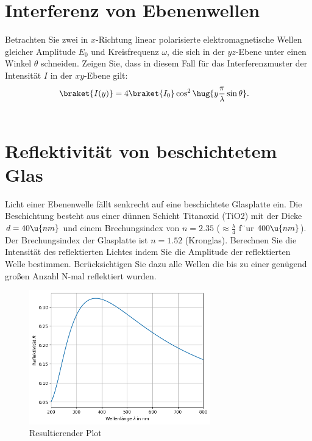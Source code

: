 \documentclass[ex,minted]{exercise}
\begin{document}
\section{Interferenz von Ebenenwellen}
Betrachten Sie zwei in $x$-Richtung linear polarisierte elektromagnetische Wellen gleicher Amplitude $E_0$ und Kreisfrequenz 
\(\omega\), die sich in der $yz$-Ebene unter einen Winkel \(\theta\) schneiden. Zeigen Sie, dass in diesem Fall für das
Interferenzmuster der Intensität \(I\) in der \(xy\)-Ebene gilt:
\begin{align*}
    \braket{I(y)}&= 4\braket{I_0}\cos^2\hug{y\frac\pi\lambda \sin\theta}.
\end{align*}

\dottedlineet 

\begin{align*}
\end{align*}


\section{Reflektivität von beschichtetem Glas}
Licht einer Ebenenwelle fällt senkrecht auf eine beschichtete Glasplatte ein. 
Die Beschichtung besteht aus einer dünnen Schicht Titanoxid (TiO2) mit der 
Dicke $d = 40 \u{nm}$ und einem Brechungsindex von $n = 2.35$ ($\approx \frac\lambda4$ f¨ur
$400 \u{nm}$). Der Brechungsindex der Glasplatte ist $n = 1.52$ (Kronglas).
Berechnen Sie die Intensität des reflektierten Lichtes indem Sie die Amplitude der 
reflektierten Welle bestimmen. Berücksichtigen Sie dazu alle Wellen die bis zu einer 
genügend großen Anzahl N-mal reflektiert wurden.


\begin{figure}[H]
    \centering
    \includegraphics[width=0.7\textwidth]{1.png}
    \caption{Resultierender Plot}
\end{figure}
\end{document}
